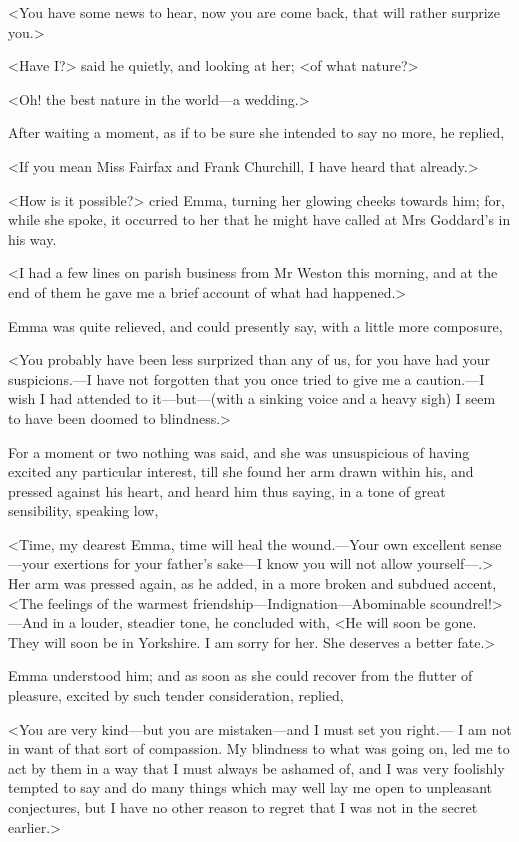 <You have some news to hear, now you are come back, that will rather surprize you.>

<Have I\@?> said he quietly, and looking at her; <of what nature?>

<Oh! the best nature in the world—a wedding.>

After waiting a moment, as if to be sure she intended to say no more, he replied,

<If you mean Miss Fairfax and Frank Churchill, I have heard that already.>

<How is it possible?> cried Emma, turning her glowing cheeks towards him; for, while she spoke, it occurred to her that he might have called at Mrs Goddard's in his way.

<I had a few lines on parish business from Mr Weston this morning, and at the end of them he gave me a brief account of what had happened.>

Emma was quite relieved, and could presently say, with a little more composure,

<You probably have been less surprized than any of us, for you have had your suspicions.—I have not forgotten that you once tried to give me a caution.—I wish I had attended to it—but—(with a sinking voice and a heavy sigh) I seem to have been doomed to blindness.>

For a moment or two nothing was said, and she was unsuspicious of having excited any particular interest, till she found her arm drawn within his, and pressed against his heart, and heard him thus saying, in a tone of great sensibility, speaking low,

<Time, my dearest Emma, time will heal the wound.—Your own excellent sense—your exertions for your father's sake—I know you will not allow yourself—.> Her arm was pressed again, as he added, in a more broken and subdued accent, <The feelings of the warmest friendship—Indignation—Abominable scoundrel!>—And in a louder, steadier tone, he concluded with, <He will soon be gone. They will soon be in Yorkshire. I am sorry for her. She deserves a better fate.>

Emma understood him; and as soon as she could recover from the flutter of pleasure, excited by such tender consideration, replied,

<You are very kind—but you are mistaken—and I must set you right.— I am not in want of that sort of compassion. My blindness to what was going on, led me to act by them in a way that I must always be ashamed of, and I was very foolishly tempted to say and do many things which may well lay me open to unpleasant conjectures, but I have no other reason to regret that I was not in the secret earlier.>

